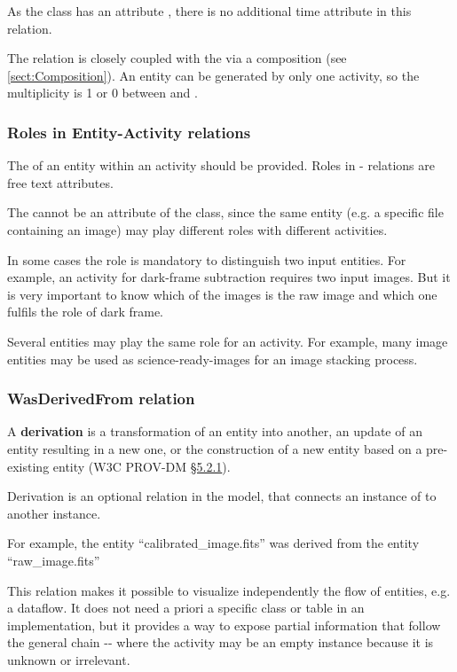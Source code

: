 As the  class has an attribute , there is no additional time attribute in this relation.

The  relation is closely coupled with the  via a composition (see \ref{sect:Composition}). 
An entity can be generated by only one activity, so the multiplicity is 1 or 0 between  and .


\subsubsection{Roles in Entity-Activity relations}
\label{sec:roles}

The  of an entity within an activity should be provided.
Roles in - relations are free text attributes.

The  cannot be an attribute of the  class, since the same entity (e.g. a specific file containing an image) may play different roles with different activities. 

In some cases the role is mandatory to distinguish two input entities. For example, an activity for dark-frame subtraction requires two input images. But it is very important to know which of the images is the raw image and which one fulfils the role of dark frame.

Several entities may play the same role for an activity. For example, many image entities may be used as science-ready-images for an image stacking process.



\subsubsection{WasDerivedFrom relation}

A \textbf{derivation} is a transformation of an entity into another, an update of an entity resulting in a new one, or the construction of a new entity based on a pre-existing entity (W3C PROV-DM \href{https://www.w3.org/TR/prov-dm/#term-Derivation}{\S5.2.1}).

Derivation is an optional relation  in the model, that connects an instance of  to another instance.

For example, the entity ``calibrated\_image.fits'' was derived from the entity ``raw\_image.fits''

This relation makes it possible to visualize independently the flow of entities, e.g. a dataflow. It does not need a priori a specific class or table in an implementation, but it provides a way to expose partial information that follow the general chain -- where the activity may be an empty instance because it is unknown or irrelevant.


